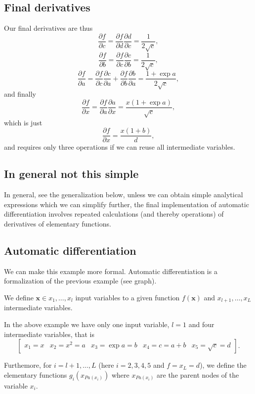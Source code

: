 \documentclass[%
oneside,                 %
final,                   %
10pt]{article}
\begin{document}
\subsection{Final derivatives}
Our final derivatives are thus
\[
\frac{\partial f}{\partial c} = \frac{\partial f}{\partial d} \frac{\partial d}{\partial c}  = \frac{1}{2\sqrt{c}},
\]
\[
\frac{\partial f}{\partial b} = \frac{\partial f}{\partial c} \frac{\partial c}{\partial b}  = \frac{1}{2\sqrt{c}},
\]
\[
\frac{\partial f}{\partial a} = \frac{\partial f}{\partial c} \frac{\partial c}{\partial a}+
\frac{\partial f}{\partial b} \frac{\partial b}{\partial a}  = \frac{1+\exp{a}}{2\sqrt{c}},
\]
and finally 
\[
\frac{\partial f}{\partial x} = \frac{\partial f}{\partial a} \frac{\partial a}{\partial x}  = \frac{x(1+\exp{a})}{\sqrt{c}},
\]
which is just
\[
\frac{\partial f}{\partial x} = \frac{x(1+b)}{d},
\]
and requires only three operations if we can reuse all intermediate variables.

\subsection{In general not this simple}

In general, see the generalization below, unless we can obtain simple
analytical expressions which we can simplify further, the final
implementation of automatic differentiation involves repeated
calculations (and thereby operations) of derivatives of elementary
functions.

\subsection{Automatic differentiation}

We can make this example more formal. Automatic differentiation is a
formalization of the previous example (see graph).

We define $\bm{x}\in x_1,\dots, x_l$ input variables to a given function $f(\bm{x})$ and $x_{l+1},\dots, x_L$ intermediate variables.

In the above example we have only one input variable, $l=1$ and four intermediate variables, that is
\[
\begin{bmatrix} x_1=x & x_2 = x^2=a & x_3 =\exp{a}= b & x_4=c=a+b & x_5 = \sqrt{c}=d \end{bmatrix}.
\]

Furthemore, for $i=l+1, \dots, L$ (here $i=2,3,4,5$ and $f=x_L=d$), we
define the elementary functions $g_i(x_{Pa(x_i)})$ where $x_{Pa(x_i)}$ are the parent nodes of the variable $x_i$.
\end{document}

